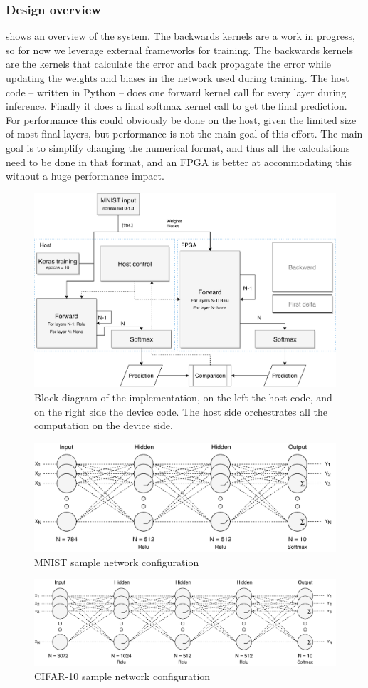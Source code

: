 \documentclass[techrep,english]{ipsj} %
\begin{document}
\subsubsection{Design overview}
 shows an overview of the system.
The backwards kernels are a work in progress, so for now we leverage external frameworks for training.
The backwards kernels are the kernels that calculate the error and back propagate the error while updating the weights and biases in the network used during training.
The host code -- written in Python -- does one forward kernel call for every layer during inference.
Finally it does a final softmax kernel call to get the final prediction.
For performance this could obviously be done on the host, given the limited size of most final layers, but performance is not the main goal of this effort.
The main goal is to simplify changing the numerical format, and thus all the calculations need to be done in that format, and an FPGA is better at accommodating this without a huge performance impact. %

\begin{figure}[p]
  \centering
  \includegraphics[width=0.7\linewidth]{block-diagram.pdf}
  \caption{Block diagram of the implementation, on the left the host code, and on the right side the device code. The host side orchestrates all the computation on the device side.}\label{fig:block-diagram}
\end{figure}

\begin{figure}[p]
  \centering
  \includegraphics[width=0.6\linewidth]{mnist-network.pdf}
  \caption{MNIST sample network configuration}\label{fig:mnist-network}
\end{figure}
\begin{figure}[p]
  \centering
  \includegraphics[width=0.8\linewidth]{cifar10-network.pdf}
  \caption{CIFAR-10 sample network configuration}\label{fig:cifar10-network}
\end{figure}
\end{document}
